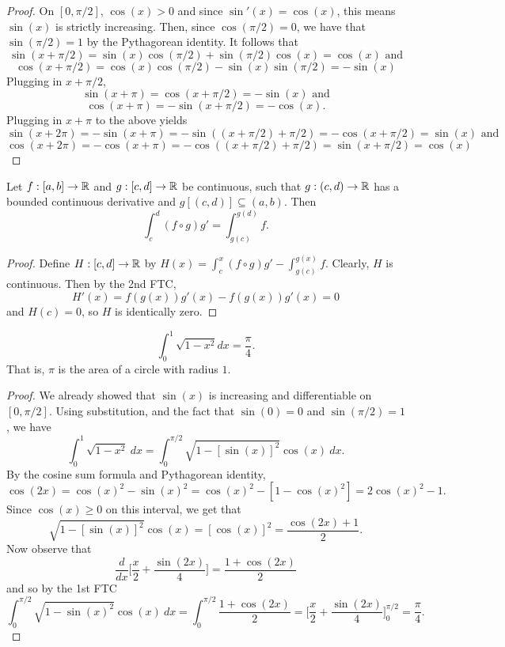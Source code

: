 \documentclass[letterpaper, twoside, 12pt]{book}
\begin{document}
\begin{proof}
    On \([0, \pi/2]\), \(\cos(x) > 0\) and since \(\sin'(x) = \cos(x)\),
    this means \(\sin(x)\) is strictly increasing. Then, since
    \(\cos(\pi/2) = 0\), we have that \(\sin(\pi/2) = 1\) by the Pythagorean
    identity. It follows that
    \[ \sin(x + \pi/2) = \sin(x)\cos(\pi/2) + \sin(\pi/2)\cos(x) = \cos(x) \text{~and}\]
    \[ \cos(x + \pi/2) = \cos(x)\cos(\pi/2) - \sin(x)\sin(\pi/2) = -\sin(x) \]
    Plugging in \(x + \pi/2\),
    \[ \sin(x + \pi) = \cos(x + \pi/2) = -\sin(x) \text{~and} \]
    \[ \cos(x + \pi) = -\sin(x + \pi/2) = -\cos(x) .\]
    Plugging in \(x + \pi\) to the above yields
    \[ \sin(x + 2\pi) = -\sin(x + \pi) = -\sin((x + \pi/2) + \pi/2) = -\cos(x + \pi/2) = \sin(x) \text{~and} \]
    \[ \cos(x + 2\pi) = -\cos(x + \pi) = -\cos((x + \pi/2) + \pi/2) = \sin(x + \pi/2) = \cos(x) \]
\end{proof}

\begin{theorem}
  Let \(f:[a,b]\to\mathbb R\) and \(g:[c,d]\to\mathbb R\) be continuous, such that
  \(g:(c,d)\to\mathbb R\) has a bounded continuous derivative and
  \(g[(c,d)]\subseteq(a,b)\). Then
  \[
    \int_c^d (f\circ g)g'
      =
    \int_{g(c)}^{g(d)} f
  .\]
\end{theorem}

\begin{proof}
    Define \(H:[c,d] \to \mathbb R\) by \(H(x) = \int_c^x (f \circ g)g' - \int_{g(c)}^{g(x)} f \).
    Clearly, \(H\) is continuous. Then by the 2nd FTC,
    \[ H'(x) = f(g(x))g'(x) - f(g(x))g'(x) = 0 \]
    and \(H(c) = 0\), so \(H\) is identically zero.
\end{proof}

\begin{proposition}
  \[
    \int_0^1\sqrt{1-x^2}dx = \frac{\pi}{4}
  .\]
  That is, \(\pi\) is the area of a circle with radius \(1\).
\end{proposition}

\begin{proof}
    We already showed that \(\sin(x)\) is increasing and differentiable on \([0, \pi/2]\).
    Using substitution, and the fact that \(\sin(0) = 0\) and \(\sin(\pi/2) = 1\), we have
    \[ \int_0^1 \sqrt{1 - x^2} ~dx = \int_0^{\pi/2} \sqrt{1 - [\sin(x)]^2} \cos(x) ~dx .\]
    By the cosine sum formula and Pythagorean identity,
    \[ \cos(2x) = \cos(x)^2 - \sin(x)^2 = \cos(x)^{2} - [1 - \cos(x)^2] = 2\cos(x)^{2} - 1 .\]
    Since \(\cos(x) \geq 0\) on this interval, we get that
    \[ \sqrt{1 - [\sin(x)]^2} \cos(x) = [\cos(x)]^2 = \frac{\cos(2x) + 1}{2} .\]
    Now observe that
    \[ \frac{d}{dx} \bigg[ \frac{x}{2} + \frac{\sin(2x)}{4} \bigg] = \frac{ 1 + \cos(2x)}{2} \]
    and so by the 1st FTC
    \[ \int_0^{\pi/2} \sqrt{1- \sin(x)^2} \cos(x) ~dx = 
    \int_0^{\pi/2} \frac{1 + \cos(2x)}{2} = \bigg[ \frac{x}{2} + \frac{\sin(2x)}{4} \bigg]^{\pi/2}_0 =
    \frac{\pi}{4} .\]
\end{proof}
\end{document}
